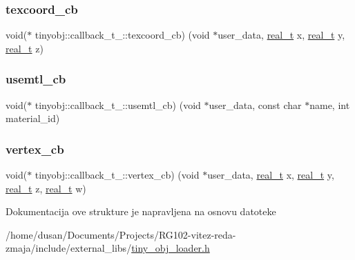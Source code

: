 \mbox{\label{structtinyobj_1_1callback__t___ac447bcedbbe734887d796b32604665e8}} 
\subsubsection{\texorpdfstring{texcoord\+\_\+cb}{texcoord\_cb}}
{\footnotesize\ttfamily void($\ast$ tinyobj\+::callback\+\_\+t\+\_\+\+::texcoord\+\_\+cb) (void $\ast$user\+\_\+data, \hyperlink{namespacetinyobj_ad5ca7469ff56bf0d8423120cfd99adce}{real\+\_\+t} x, \hyperlink{namespacetinyobj_ad5ca7469ff56bf0d8423120cfd99adce}{real\+\_\+t} y, \hyperlink{namespacetinyobj_ad5ca7469ff56bf0d8423120cfd99adce}{real\+\_\+t} z)}

\mbox{\label{structtinyobj_1_1callback__t___a8c5ae85ae10186b6c0e925b4b2b9a987}} 
\subsubsection{\texorpdfstring{usemtl\+\_\+cb}{usemtl\_cb}}
{\footnotesize\ttfamily void($\ast$ tinyobj\+::callback\+\_\+t\+\_\+\+::usemtl\+\_\+cb) (void $\ast$user\+\_\+data, const char $\ast$name, int material\+\_\+id)}

\mbox{\label{structtinyobj_1_1callback__t___a7029c16962a3edb4b036330f02f91816}} 
\subsubsection{\texorpdfstring{vertex\+\_\+cb}{vertex\_cb}}
{\footnotesize\ttfamily void($\ast$ tinyobj\+::callback\+\_\+t\+\_\+\+::vertex\+\_\+cb) (void $\ast$user\+\_\+data, \hyperlink{namespacetinyobj_ad5ca7469ff56bf0d8423120cfd99adce}{real\+\_\+t} x, \hyperlink{namespacetinyobj_ad5ca7469ff56bf0d8423120cfd99adce}{real\+\_\+t} y, \hyperlink{namespacetinyobj_ad5ca7469ff56bf0d8423120cfd99adce}{real\+\_\+t} z, \hyperlink{namespacetinyobj_ad5ca7469ff56bf0d8423120cfd99adce}{real\+\_\+t} w)}



Dokumentacija ove strukture je napravljena na osnovu datoteke \begin{DoxyCompactItemize}
\item 
/home/dusan/\+Documents/\+Projects/\+R\+G102-\/vitez-\/reda-\/zmaja/include/external\+\_\+libs/\hyperlink{tiny__obj__loader_8h}{tiny\+\_\+obj\+\_\+loader.\+h}\end{DoxyCompactItemize}

